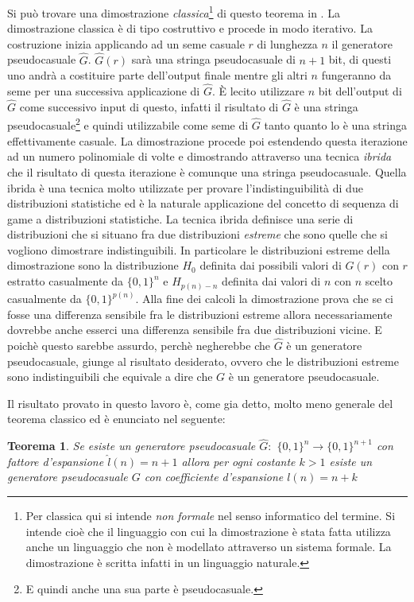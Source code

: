 \documentclass[a4paper,openright,twoside,12pt]{report}
\newtheorem{teorema}{Teorema}[chapter]
\begin{document}
Si pu\`o trovare una dimostrazione \emph{classica}\footnote{Per classica qui si intende \emph{non formale} nel senso informatico del termine.
Si intende cio\`e che il linguaggio con cui la dimostrazione \`e stata fatta utilizza anche un linguaggio che non \`e modellato
attraverso un sistema formale. La dimostrazione \`e scritta infatti in un linguaggio naturale.} di questo teorema in \cite{1206501}. 
La dimostrazione classica \`e di tipo costruttivo e procede in modo iterativo.
La costruzione inizia applicando ad un seme casuale $r$ di lunghezza $n$ il generatore pseudocasuale $\hat{G}$. 
$\hat{G}(r)$ sar\`a una stringa pseudocasuale di $n+1$ bit, di questi uno andr\`a a costituire parte dell'output finale mentre gli altri 
$n$ fungeranno da seme per una successiva applicazione di $\hat{G}$. 
\`E lecito utilizzare $n$ bit dell'output di $\hat{G}$ come successivo input di questo, infatti il risultato di $\hat{G}$ \`e 
una stringa pseudocasuale\footnote{E quindi anche una sua parte \`e pseudocasuale.} e quindi utilizzabile come seme di $\hat{G}$ tanto quanto 
lo \`e una stringa effettivamente casuale.
La dimostrazione procede poi estendendo questa iterazione ad un numero polinomiale di volte e dimostrando attraverso una tecnica \emph{ibrida}
che il risultato di questa iterazione \`e comunque una stringa pseudocasuale. Quella ibrida \`e una tecnica molto utilizzate per provare l'indistinguibilit\`a di due distribuzioni statistiche ed \`e 
la naturale applicazione del concetto di sequenza di game a distribuzioni statistiche.
La tecnica ibrida definisce una serie di distribuzioni che si situano fra due distribuzioni \emph{estreme} che sono quelle che si vogliono dimostrare indistinguibili.
In particolare le distribuzioni estreme della dimostrazione sono la distribuzione $H_0$ definita dai possibili valori di $G(r)$ con $r$ estratto casualmente da $\{0,1\}^n$ e $H_{p(n)-n}$ definita dai valori di $n$ con $n$ scelto
casualmente da $\{0, 1\}^{p(n)}$. 
Alla fine dei calcoli la dimostrazione prova che se ci fosse una differenza sensibile fra le distribuzioni estreme allora necessariamente dovrebbe anche esserci una differenza
sensibile fra due distribuzioni vicine. E poich\`e questo sarebbe assurdo, perch\`e negherebbe che $\hat{G}$ \`e un generatore pseudocasuale, giunge al risultato desiderato, ovvero che
le distribuzioni estreme sono indistinguibili che equivale a dire che $G$ \`e un generatore pseudocasuale.


Il risultato provato in questo lavoro \`e, come gia detto, molto meno generale del teorema classico ed \`e enunciato nel seguente:
\begin{teorema}
Se esiste un generatore pseudocasuale $\hat{G}:$ $\{0, 1\}^n \rightarrow \{0, 1\}^{n+1}$ 
con fattore d'espansione $\hat{l}(n)=n+1$ allora per ogni costante $k > 1$ esiste un generatore 
pseudocasuale $G$ con coefficiente d'espansione $l(n)=n+k$
\end{teorema}
\end{document}
